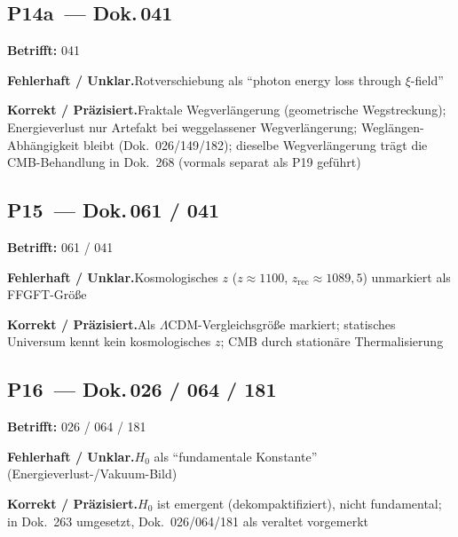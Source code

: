 \medskip


\subsection*{P14a~--- Dok.\,041}

\noindent\textbf{Betrifft:} 041


\smallskip\noindent\textbf{Fehlerhaft / Unklar.}\quad Rotverschiebung als \enquote{photon energy loss through $\xi$-field}


\smallskip\noindent\textbf{Korrekt / Präzisiert.}\quad Fraktale Wegverlängerung (geometrische Wegstreckung); Energieverlust nur Artefakt bei weggelassener Wegverlängerung; Weglängen-Abhängigkeit bleibt (Dok.~026/149/182); dieselbe Wegverlängerung trägt die CMB-Behandlung in Dok.~268 (vormals separat als P19 geführt)


\medskip


\subsection*{P15~--- Dok.\,061 / 041}

\noindent\textbf{Betrifft:} 061 / 041


\smallskip\noindent\textbf{Fehlerhaft / Unklar.}\quad Kosmologisches $z$ ($z\approx 1100$, $z_{\text{rec}}\approx 1089{,}5$) unmarkiert als FFGFT-Größe


\smallskip\noindent\textbf{Korrekt / Präzisiert.}\quad Als $\Lambda$CDM-Vergleichsgröße markiert; statisches Universum kennt kein kosmologisches $z$; CMB durch stationäre Thermalisierung


\medskip


\subsection*{P16~--- Dok.\,026 / 064 / 181}

\noindent\textbf{Betrifft:} 026 / 064 / 181


\smallskip\noindent\textbf{Fehlerhaft / Unklar.}\quad $H_0$ als \enquote{fundamentale Konstante} (Energieverlust-/Vakuum-Bild)


\smallskip\noindent\textbf{Korrekt / Präzisiert.}\quad $H_0$ ist emergent (dekompaktifiziert), nicht fundamental; in Dok.~263 umgesetzt, Dok.~026/064/181 als veraltet vorgemerkt


